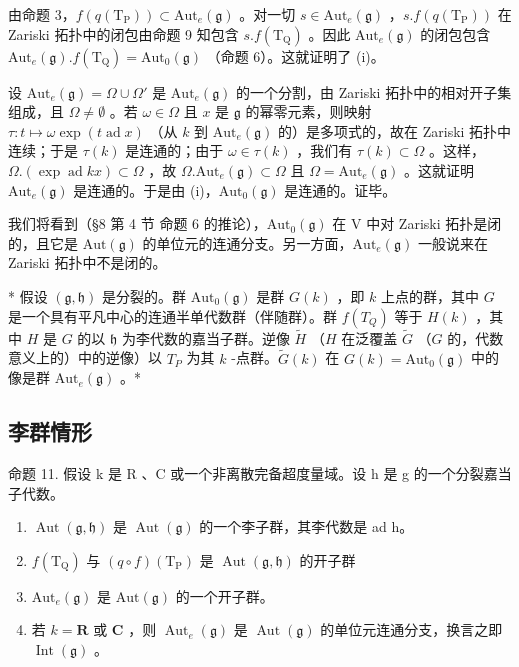 由命题 3，\(f(q(\mathrm{T}_{\mathrm{P}})) \subset \mathrm{Aut}_e(\mathfrak{g})\) 。对一切 \(s \in \mathrm{Aut}_e(\mathfrak{g})\) ，\(s.f(q(\mathrm{T}_{\mathrm{P}}))\) 在 Zariski 拓扑中的闭包由命题 9 知包含 \(s.f(\mathrm{T}_{\mathrm{Q}})\) 。因此 \(\mathrm{Aut}_e(\mathfrak{g})\) 的闭包包含 \(\mathrm{Aut}_e(\mathfrak{g}).f(\mathrm{T}_{\mathrm{Q}}) = \mathrm{Aut}_0(\mathfrak{g})\) （命题 6）。这就证明了 (i)。

设 \(\mathrm{Aut}_e(\mathfrak{g}) = \Omega \cup \Omega'\) 是 \(\mathrm{Aut}_e(\mathfrak{g})\) 的一个分割，由 Zariski 拓扑中的相对开子集组成，且 \(\Omega \neq \emptyset\) 。若 \(\omega \in \Omega\) 且 \(x\) 是 \(\mathfrak{g}\) 的幂零元素，则映射 \(\tau : t \mapsto \omega \exp(t \operatorname{ad} x)\) （从 \(k\) 到 \(\mathrm{Aut}_e(\mathfrak{g})\) 的）是多项式的，故在 Zariski 拓扑中连续；于是 \(\tau(k)\) 是连通的；由于 \(\omega \in \tau(k)\) ，我们有 \(\tau(k) \subset \Omega\) 。这样，\(\Omega. (\exp \operatorname{ad} kx) \subset \Omega\) ，故 \(\Omega. \mathrm{Aut}_e(\mathfrak{g}) \subset \Omega\) 且 \(\Omega = \mathrm{Aut}_e(\mathfrak{g})\) 。这就证明 \(\mathrm{Aut}_e(\mathfrak{g})\) 是连通的。于是由 (i)，\(\mathrm{Aut}_0(\mathfrak{g})\) 是连通的。证毕。

我们将看到（§8 第 4 节 命题 6 的推论），\(\mathrm{Aut}_0(\mathfrak{g})\) 在 V 中对 Zariski 拓扑是闭的，且它是 \(\mathrm{Aut}(\mathfrak{g})\) 的单位元的连通分支。另一方面，\(\mathrm{Aut}_e(\mathfrak{g})\) 一般说来在 Zariski 拓扑中不是闭的。

* 假设 \((\mathfrak{g},\mathfrak{h})\) 是分裂的。群 \(\mathrm{Aut}_0(\mathfrak{g})\) 是群 \(G(k)\) ，即 \(k\) 上点的群，其中 \(G\) 是一个具有平凡中心的连通半单代数群（伴随群）。群 \(f(T_{Q})\) 等于 \(H(k)\) ，其中 \(H\) 是 \(G\) 的以 \(\mathfrak{h}\) 为李代数的嘉当子群。逆像 \(\tilde{H}\) （\(H\) 在泛覆盖 \(\tilde{G}\) （\(G\) 的，代数意义上的）中的逆像）以 \(T_{P}\) 为其 \(k\) -点群。\(\tilde{G}(k)\) 在 \(G(k) = \mathrm{Aut}_0(\mathfrak{g})\) 中的像是群 \(\mathrm{Aut}_e(\mathfrak{g})\) 。*

\subsection{李群情形}

命题 11. 假设 k 是 R 、C 或一个非离散完备超度量域。设 h 是 g 的一个分裂嘉当子代数。

\begin{enumerate}
\def\labelenumi{(\roman{enumi})}
\item
  \(\operatorname{Aut}(\mathfrak{g},\mathfrak{h})\) 是 \(\operatorname{Aut}(\mathfrak{g})\) 的一个李子群，其李代数是 ad h。
\item
  \(f(\mathrm{T}_{\mathrm{Q}})\) 与 \((q\circ f)(\mathrm{T}_{\mathrm{P}})\) 是 \(\operatorname {Aut}(\mathfrak{g},\mathfrak{h})\) 的开子群
\item
  \(\mathrm{Aut}_e(\mathfrak{g})\) 是 \(\mathrm{Aut}(\mathfrak{g})\) 的一个开子群。
\item
  若 \(k = \mathbf{R}\) 或 \(\mathbf{C}\) ，则 \(\operatorname{Aut}_e(\mathfrak{g})\) 是 \(\operatorname{Aut}(\mathfrak{g})\) 的单位元连通分支，换言之即 \(\operatorname{Int}(\mathfrak{g})\) 。
\end{enumerate}

